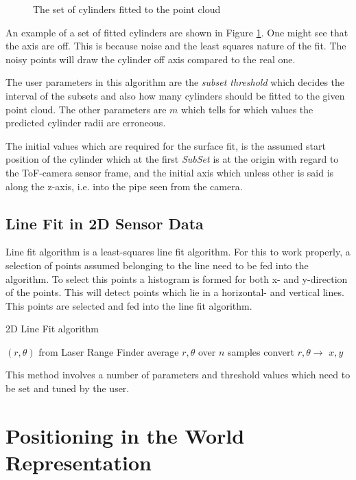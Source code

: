 \begin{figure}[htbp]
    \centering
    \caption{The set of cylinders fitted to the point cloud}
    \label{chap5:fig-cylinderfit}
\end{figure}
An example of a set of fitted cylinders are shown in Figure \ref{chap5:fig-cylinderfit}.
One might see that the axis are off. This is because noise and the least squares nature of
the fit. The noisy points will draw the cylinder off axis compared to the real one. 

The user parameters in this algorithm are the \emph{subset threshold} which decides the interval
of the subsets and also how many cylinders should be fitted to the given point cloud. The
other parameters are $m$ which tells for which values the predicted cylinder radii are
erroneous. 

The initial values which are required for the surface fit, is the assumed start position
of the cylinder which at the first \emph{SubSet} is at the origin with regard to the
ToF-camera sensor frame, and the initial axis which unless other is said is along the
z-axis, i.e. into the pipe seen from the camera.


\subsection{Line Fit in 2D Sensor Data}
Line fit algorithm is a least-squares line fit algorithm. For this to work properly, a
selection of points assumed belonging to the line need to be fed into the algorithm. To
select this points a histogram is formed for both x- and y-direction of the points. This
will detect points which lie in a horizontal- and vertical lines. This points are selected
and fed into the line fit algorithm. 

\begin{algorithm}[htbp]
    \caption{2D Line Fit algorithm}
    \label{chap5:alg-2dlinefit}
    \begin{algorithmic}
        \REQUIRE $(r, \theta)$ from Laser Range Finder
        \STATE average $r, \theta$ over $n$ samples
        \STATE convert $r, \theta \rightarrow$ $x, y$ 
    \end{algorithmic}
\end{algorithm}

This method involves a number of parameters and threshold values which need to be set and
tuned by the user. 



\section{Positioning in the World Representation}




